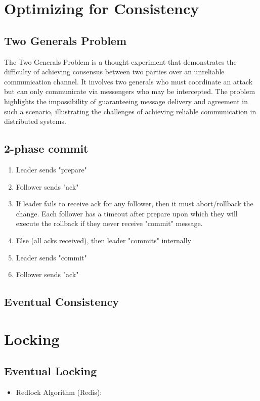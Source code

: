 \documentclass{article}
\begin{document}
\section{Optimizing for Consistency}
    \subsection{Two Generals Problem}
      The Two Generals Problem is a thought experiment that demonstrates the difficulty of achieving consensus between two parties over an unreliable communication channel. It involves two generals who must coordinate an attack but can only communicate via messengers who may be intercepted. The problem highlights the impossibility of guaranteeing message delivery and agreement in such a scenario, illustrating the challenges of achieving reliable communication in distributed systems.
    \subsection{2-phase commit}
      \begin{enumerate}
        \item Leader sends "prepare"
        \item Follower sends "ack"
        \item If leader fails to receive ack for any follower, then it must abort/rollback the change. Each follower has a timeout after prepare upon which they will execute the rollback if they never receive "commit" message.
        \item Else (all acks received), then leader "commits" internally
        \item Leader sends "commit"
        \item Follower sends "ack"
      \end{enumerate}
    \subsection{Eventual Consistency}
\section{Locking}
    \subsection{Eventual Locking}
      \begin{itemize}
        \item Redlock Algorithm (Redis):
      \end{itemize}
\end{document}
